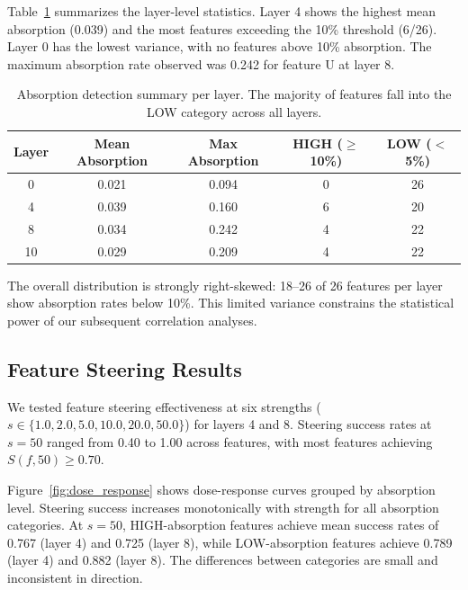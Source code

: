 \documentclass{article}
\begin{document}
Table~\ref{tab:layer_summary} summarizes the layer-level statistics. Layer 4 shows the highest mean absorption (0.039) and the most features exceeding the 10\% threshold (6/26). Layer 0 has the lowest variance, with no features above 10\% absorption. The maximum absorption rate observed was 0.242 for feature U at layer 8.

\begin{table}[t]
\caption{Absorption detection summary per layer. The majority of features fall into the LOW category across all layers.}
\label{tab:layer_summary}
\centering
\begin{tabular}{ccccc}
\toprule
Layer & Mean Absorption & Max Absorption & HIGH ($\geq$10\%) & LOW ($<$5\%) \\
\midrule
0     & 0.021           & 0.094          & 0                & 26           \\
4     & 0.039           & 0.160          & 6                & 20           \\
8     & 0.034           & 0.242          & 4                & 22           \\
10    & 0.029           & 0.209          & 4                & 22           \\
\bottomrule
\end{tabular}
\end{table}

The overall distribution is strongly right-skewed: 18--26 of 26 features per layer show absorption rates below 10\%. This limited variance constrains the statistical power of our subsequent correlation analyses.

\subsection{Feature Steering Results}

We tested feature steering effectiveness at six strengths ($s \in \{1.0, 2.0, 5.0, 10.0, 20.0, 50.0\}$) for layers 4 and 8. Steering success rates at $s = 50$ ranged from 0.40 to 1.00 across features, with most features achieving $S(f, 50) \geq 0.70$.

Figure~\ref{fig:dose_response} shows dose-response curves grouped by absorption level. Steering success increases monotonically with strength for all absorption categories. At $s = 50$, HIGH-absorption features achieve mean success rates of 0.767 (layer 4) and 0.725 (layer 8), while LOW-absorption features achieve 0.789 (layer 4) and 0.882 (layer 8). The differences between categories are small and inconsistent in direction.
\end{document}
